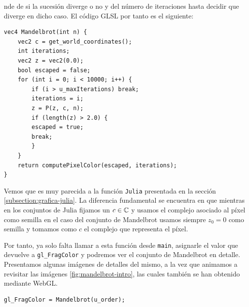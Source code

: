 nde de si la sucesión diverge o no y del número de iteraciones hasta decidir que diverge en dicho caso. El código GLSL por tanto es el siguiente:

\begin{lstlisting}
vec4 Mandelbrot(int n) {
    vec2 c = get_world_coordinates();
    int iterations;
    vec2 z = vec2(0.0);
    bool escaped = false;
    for (int i = 0; i < 10000; i++) {
        if (i > u_maxIterations) break;
        iterations = i;
        z = P(z, c, n);
        if (length(z) > 2.0) {
        escaped = true;
        break;
        }
    }
    return computePixelColor(escaped, iterations);
}
\end{lstlisting}

Vemos que es muy parecida a la función \verb|Julia| presentada en la sección \ref{subsection:grafica-julia}. La diferencia fundamental se encuentra en que mientras en los conjuntos de Julia fijamos un $c\in\mathbb{C}$ y usamos el complejo asociado al píxel como semilla en el caso del conjunto de Mandelbrot usamos siempre $z_0=0$ como semilla y tomamos como $c$ el complejo que representa el píxel.

Por tanto, ya solo falta llamar a esta función desde \verb|main|, asignarle el valor que devuelve a \verb|gl_FragColor| y podremos ver el conjunto de Mandelbrot en detalle. Presentamos algunas imágenes de detalles del mismo, a la vez que animamos a revisitar las imágenes \ref{fig:mandelbrot-intro}, las cuales también se han obtenido mediante WebGL.

\begin{lstlisting}
gl_FragColor = Mandelbrot(u_order);
\end{lstlisting}

